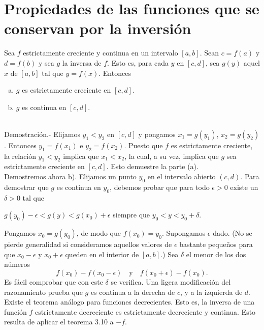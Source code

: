 \section{Propiedades de las funciones que se conservan por la inversión}

\begin{teo}
    Sea $f$ estrictamente creciente y continua en un intervalo $[a,b]$. Sean $c=f(a)$ y $d=f(b)$ y sea $g$ la inversa de $f$. Esto es, para cada $y$ en $[c,d]$, sea $g(y)$ aquel $x$ de $[a,b]$ tal que $y=f(x)$. Entonces
    \begin{enumerate}[(a)]
	\item $g$ es estrictamente creciente en $[c,d]$.
	\item $g$ es continua en $[c,d]$.\\\\
    \end{enumerate}
	Demostración.-\; Elijamos $y_1<y_2$ en $[c,d]$ y pongamos $x_1=g(y_1)$, $x_2=g(y_2)$. Entonces $y_1 = f(x_1)$ e $y_2=f(x_2)$. Puesto que $f$ es estrictamente creciente, la relación $y_1<y_2$ implica que $x_1<x_2$, la cual, a su vez, implica que $g$ sea estrictamente creciente en $[c,d]$. Esto demuestre la parte (a).\\
	Demostremos ahora b). Elijamos un punto $y_0$ en el intervalo abierto $(c,d)$. Para demostrar que $g$ es continua en $y_0$, debemos probar que para todo $\epsilon>0$ existe un $\delta>0$ tal que 
	\begin{center}
	    $g(y_0)-\epsilon < g(y) < g(x_0) + \epsilon$ siempre que $y_0<y<y_0+\delta.$
	\end{center}
	Pongamos $x_0=g(y_0)$, de modo que $f(x_0)=y_0$. Supongamos $\epsilon$ dado. (No se pierde generalidad si consideramos aquellos valores de $\epsilon$ bastante pequeños para que $x_0-\epsilon$ y $x_0+\epsilon$ queden en el interior de $[a,b].$) Sea $\delta$ el menor de los dos números 
	$$f(x_0)-f(x_0-\epsilon)\quad \mbox{y}\quad f(x_0+\epsilon)-f(x_0).$$
	Es fácil comprobar que con este $\delta$ se verifica. Una ligera modificación del razonamiento prueba que $g$ es continua a la derecha de $c$, y a la izquierda de $d$.\\
	Existe el teorema análogo para funciones decrecientes. Esto es, la inversa de una función $f$ estrictamente decreciente es estrictamente decreciente y continua. Esto resulta de aplicar el teorema 3.10 a $-f$.\\\\
\end{teo}

